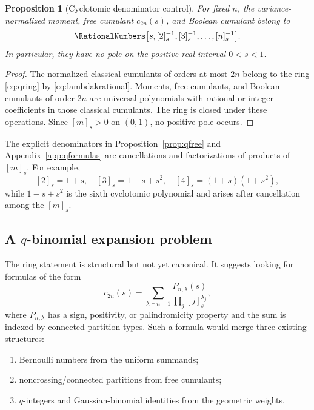 \documentclass[11pt,oneside]{article}
\newtheorem{proposition}[theorem]{Proposition}
\theoremstyle{definition}
\theoremstyle{remark}
\begin{document}
\begin{proposition}[Cyclotomic denominator control]\label{prop:cyclotomic}
For fixed \(n\), the variance-normalized moment, free cumulant \(c_{2n}(s)\), and Boolean cumulant belong to
\begin{equation}\label{eq:qring}
\RationalNumbers\bigl[s,[2]_s^{-1},[3]_s^{-1},\ldots,[n]_s^{-1}\bigr].
\end{equation}
In particular, they have no pole on the positive real interval \(0<s<1\).
\end{proposition}
\begin{proof}
The normalized classical cumulants of orders at most \(2n\) belong to the ring \eqref{eq:qring} by \eqref{eq:lambdakrational}. Moments, free cumulants, and Boolean cumulants of order \(2n\) are universal polynomials with rational or integer coefficients in those classical cumulants. The ring is closed under these operations. Since \([m]_s>0\) on \((0,1)\), no positive pole occurs.
\end{proof}

The explicit denominators in Proposition~\ref{prop:qfree} and Appendix~\ref{app:qformulas} are cancellations and factorizations of products of \([m]_s\). For example,
\[
[2]_s=1+s,
\quad [3]_s=1+s+s^2,
\quad [4]_s=(1+s)(1+s^2),
\]
while \(1-s+s^2\) is the sixth cyclotomic polynomial and arises after cancellation among the \([m]_s\).

\subsection{A \texorpdfstring{\(q\)}{q}-binomial expansion problem}
The ring statement is structural but not yet canonical. It suggests looking for formulas of the form
\begin{equation}\label{eq:qbinomialdesired}
c_{2n}(s)=\sum_{\lambda\vdash n-1}
\frac{P_{n,\lambda}(s)}{\prod_j[j]_s^{\lambda_j}},
\end{equation}
where \(P_{n,\lambda}\) has a sign, positivity, or palindromicity property and the sum is indexed by connected partition types. Such a formula would merge three existing structures:
\begin{enumerate}[label=(\roman*)]
\item Bernoulli numbers from the uniform summands;
\item noncrossing/connected partitions from free cumulants;
\item \(q\)-integers and Gaussian-binomial identities from the geometric weights.
\end{enumerate}
\end{document}
